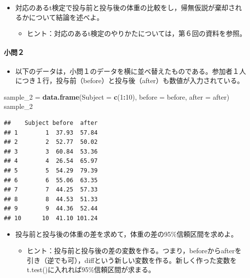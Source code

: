 \documentclass[]{article}
\newenvironment{Shaded}{\begin{snugshade}}{\end{snugshade}}
\newcommand{\KeywordTok}[1]{\textcolor[rgb]{0.13,0.29,0.53}{\textbf{#1}}}
\newcommand{\DataTypeTok}[1]{\textcolor[rgb]{0.13,0.29,0.53}{#1}}
\newcommand{\DecValTok}[1]{\textcolor[rgb]{0.00,0.00,0.81}{#1}}
\newcommand{\StringTok}[1]{\textcolor[rgb]{0.31,0.60,0.02}{#1}}
\newcommand{\OperatorTok}[1]{\textcolor[rgb]{0.81,0.36,0.00}{\textbf{#1}}}
\newcommand{\NormalTok}[1]{#1}
\providecommand{\tightlist}{%
  \setlength{\itemsep}{0pt}\setlength{\parskip}{0pt}}
\let\oldparagraph\paragraph
\renewcommand{\paragraph}[1]{\oldparagraph{#1}\mbox{}}
\begin{document}
\begin{itemize}
\tightlist
\item
  対応のあるt検定で投与前と投与後の体重の比較をし，帰無仮説が棄却されるかについて結論を述べよ。

  \begin{itemize}
  \tightlist
  \item
    ヒント：対応のあるt検定のやりかたについては，第６回の資料を参照。
  \end{itemize}
\end{itemize}

\paragraph{小問２}

\begin{itemize}
\tightlist
\item
  以下のデータは，小問１のデータを横に並べ替えたものである。参加者１人につき１行，投与前（before）と投与後（after）も数値が入力されている。
\end{itemize}

\begin{Shaded}
\begin{Highlighting}[]
\NormalTok{sample_}\DecValTok{2}\NormalTok{ =}\StringTok{ }\KeywordTok{data.frame}\NormalTok{(}\DataTypeTok{Subject =} \KeywordTok{c}\NormalTok{(}\DecValTok{1}\OperatorTok{:}\DecValTok{10}\NormalTok{), }\DataTypeTok{before =}\NormalTok{ before, }\DataTypeTok{after =}\NormalTok{ after)}
\NormalTok{sample_}\DecValTok{2}
\end{Highlighting}
\end{Shaded}

\begin{verbatim}
##    Subject before  after
## 1        1  37.93  57.84
## 2        2  52.77  50.02
## 3        3  60.84  53.36
## 4        4  26.54  65.97
## 5        5  54.29  79.39
## 6        6  55.06  63.35
## 7        7  44.25  57.33
## 8        8  44.53  51.33
## 9        9  44.36  52.44
## 10      10  41.10 101.24
\end{verbatim}

\begin{itemize}
\tightlist
\item
  投与前と投与後の体重の差を求めて，体重の差の95\%信頼区間を求めよ。

  \begin{itemize}
  \tightlist
  \item
    ヒント：投与前と投与後の差の変数を作る。つまり，beforeからafterを引き（逆でも可），diffという新しい変数を作る。新しく作った変数をt.test()に入れれば95\%信頼区間が求まる。
  \end{itemize}
\end{itemize}
\end{document}

